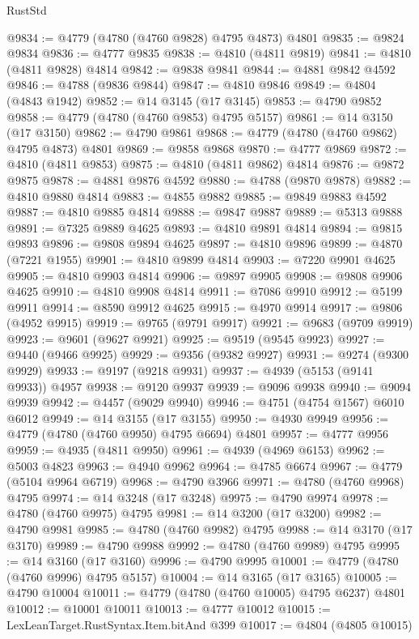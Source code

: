 \begin{lexlean}{RustStd}
\begin{coremodule}
@9834 := @4779 (@4780 (@4760 @9828) @4795 @4873) @4801
@9835 := @9824 @9834
@9836 := @4777 @9835
@9838 := @4810 (@4811 @9819)
@9841 := @4810 (@4811 @9828) @4814
@9842 := @9838 @9841
@9844 := @4881 @9842 @4592
@9846 := @4788 (@9836 @9844)
@9847 := @4810 @9846
@9849 := @4804 (@4843 @1942)
@9852 := @14 @3145 (@17 @3145)
@9853 := @4790 @9852
@9858 := @4779 (@4780 (@4760 @9853) @4795 @5157)
@9861 := @14 @3150 (@17 @3150)
@9862 := @4790 @9861
@9868 := @4779 (@4780 (@4760 @9862) @4795 @4873) @4801
@9869 := @9858 @9868
@9870 := @4777 @9869
@9872 := @4810 (@4811 @9853)
@9875 := @4810 (@4811 @9862) @4814
@9876 := @9872 @9875
@9878 := @4881 @9876 @4592
@9880 := @4788 (@9870 @9878)
@9882 := @4810 @9880 @4814
@9883 := @4855 @9882
@9885 := @9849 @9883 @4592
@9887 := @4810 @9885 @4814
@9888 := @9847 @9887
@9889 := @5313 @9888
@9891 := @7325 @9889 @4625
@9893 := @4810 @9891 @4814
@9894 := @9815 @9893
@9896 := @9808 @9894 @4625
@9897 := @4810 @9896
@9899 := @4870 (@7221 @1955)
@9901 := @4810 @9899 @4814
@9903 := @7220 @9901 @4625
@9905 := @4810 @9903 @4814
@9906 := @9897 @9905
@9908 := @9808 @9906 @4625
@9910 := @4810 @9908 @4814
@9911 := @7086 @9910
@9912 := @5199 @9911
@9914 := @8590 @9912 @4625
@9915 := @4970 @9914
@9917 := @9806 (@4952 @9915)
@9919 := @9765 (@9791 @9917)
@9921 := @9683 (@9709 @9919)
@9923 := @9601 (@9627 @9921)
@9925 := @9519 (@9545 @9923)
@9927 := @9440 (@9466 @9925)
@9929 := @9356 (@9382 @9927)
@9931 := @9274 (@9300 @9929)
@9933 := @9197 (@9218 @9931)
@9937 := @4939 (@5153 (@9141 @9933)) @4957
@9938 := @9120 @9937
@9939 := @9096 @9938
@9940 := @9094 @9939
@9942 := @4457 (@9029 @9940)
@9946 := @4751 (@4754 @1567) @6010 @6012
@9949 := @14 @3155 (@17 @3155)
@9950 := @4930 @9949
@9956 := @4779 (@4780 (@4760 @9950) @4795 @6694) @4801
@9957 := @4777 @9956
@9959 := @4935 (@4811 @9950)
@9961 := @4939 (@4969 @6153)
@9962 := @5003 @4823
@9963 := @4940 @9962
@9964 := @4785 @6674
@9967 := @4779 (@5104 @9964 @6719)
@9968 := @4790 @3966
@9971 := @4780 (@4760 @9968) @4795
@9974 := @14 @3248 (@17 @3248)
@9975 := @4790 @9974
@9978 := @4780 (@4760 @9975) @4795
@9981 := @14 @3200 (@17 @3200)
@9982 := @4790 @9981
@9985 := @4780 (@4760 @9982) @4795
@9988 := @14 @3170 (@17 @3170)
@9989 := @4790 @9988
@9992 := @4780 (@4760 @9989) @4795
@9995 := @14 @3160 (@17 @3160)
@9996 := @4790 @9995
@10001 := @4779 (@4780 (@4760 @9996) @4795 @5157)
@10004 := @14 @3165 (@17 @3165)
@10005 := @4790 @10004
@10011 := @4779 (@4780 (@4760 @10005) @4795 @6237) @4801
@10012 := @10001 @10011
@10013 := @4777 @10012
@10015 := LexLeanTarget.RustSyntax.Item.bitAnd @399
@10017 := @4804 (@4805 @10015)

\end{coremodule}
\end{lexlean}
